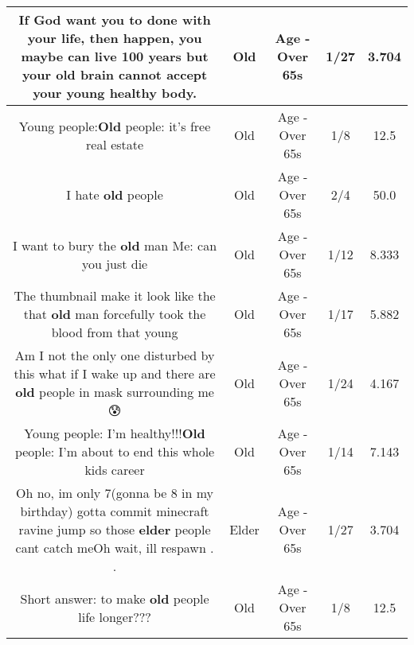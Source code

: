 \documentclass[11pt]{article}
\newlength\mylength
\begin{document}
\begin{center}
\begin{longtable}{|C{.65\mylength}|C{.30\mylength}|C{.12\mylength}|C{.12\mylength}|C{.12\mylength}|}
  \small If God want you to done with your life, then happen, you maybe can live 100 years but your \textbf{old} brain cannot accept your young healthy body.\normalsize   & Old & Age - Over 65s & 1/27 & 3.704 \\  \hline
  \small Young people:\textbf{Old} people: it's free real estate\normalsize   & Old & Age - Over 65s & 1/8 & 12.5 \\  \hline
  \small I hate \textbf{old} people\normalsize   & Old & Age - Over 65s & 2/4 & 50.0 \\  \hline
  \small I want to bury the \textbf{old} man Me: can you just die\normalsize   & Old & Age - Over 65s & 1/12 & 8.333 \\  \hline
  \small The thumbnail make it look like the that \textbf{old} man forcefully took the blood from that young\normalsize   & Old & Age - Over 65s & 1/17 & 5.882 \\  \hline
  \small Am I not the only one disturbed by this what if I wake up and there are \textbf{old} people in mask surrounding me 😰\normalsize   & Old & Age - Over 65s & 1/24 & 4.167 \\  \hline
  \small Young people: I'm healthy!!!\textbf{Old} people: I'm about to end this whole kids career\normalsize   & Old & Age - Over 65s & 1/14 & 7.143 \\  \hline
  \small Oh no, im only 7(gonna be 8 in my birthday) gotta commit minecraft ravine jump so those \textbf{elder} people cant catch meOh wait, ill respawn . .\normalsize   & Elder & Age - Over 65s & 1/27 & 3.704 \\  \hline
  \small Short answer: to make \textbf{old} people life longer???\normalsize   & Old & Age - Over 65s & 1/8 & 12.5 \\  \hline

\end{longtable}
\end{center}
\end{document}
